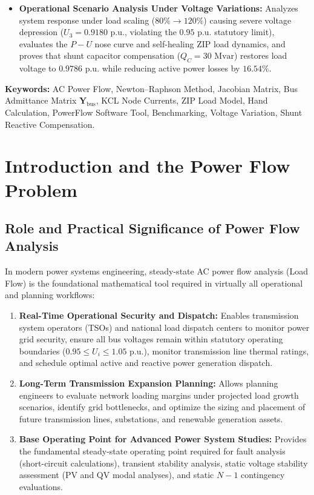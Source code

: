 \documentclass[12pt,a4paper,oneside]{report}
\begin{document}
\begin{itemize}
    \item \textbf{Operational Scenario Analysis Under Voltage Variations:} Analyzes system response under load scaling ($80\% \to 120\%$) causing severe voltage depression ($U_3 = 0.9180\text{ p.u.}$, violating the $0.95\text{ p.u.}$ statutory limit), evaluates the $P-U$ nose curve and self-healing ZIP load dynamics, and proves that shunt capacitor compensation ($Q_C = 30\text{ Mvar}$) restores load voltage to $0.9786\text{ p.u.}$ while reducing active power losses by $16.54\%$.
\end{itemize}

\noindent \textbf{Keywords:} AC Power Flow, Newton--Raphson Method, Jacobian Matrix, Bus Admittance Matrix $\mathbf{Y}_{\text{bus}}$, KCL Node Currents, ZIP Load Model, Hand Calculation, PowerFlow Software Tool, Benchmarking, Voltage Variation, Shunt Reactive Compensation.

\newpage

\tableofcontents
\newpage
\listoffigures
\newpage
\listoftables
\newpage
{}
\setcounter{page}{1}

\chapter{Introduction and the Power Flow Problem}

\section{Role and Practical Significance of Power Flow Analysis}
In modern power systems engineering, steady-state AC power flow analysis (Load Flow) is the foundational mathematical tool required in virtually all operational and planning workflows:
\begin{enumerate}
    \item \textbf{Real-Time Operational Security and Dispatch:} Enables transmission system operators (TSOs) and national load dispatch centers to monitor power grid security, ensure all bus voltages remain within statutory operating boundaries ($0.95 \le U_i \le 1.05\text{ p.u.}$), monitor transmission line thermal ratings, and schedule optimal active and reactive power generation dispatch.
    \item \textbf{Long-Term Transmission Expansion Planning:} Allows planning engineers to evaluate network loading margins under projected load growth scenarios, identify grid bottlenecks, and optimize the sizing and placement of future transmission lines, substations, and renewable generation assets.
    \item \textbf{Base Operating Point for Advanced Power System Studies:} Provides the fundamental steady-state operating point required for fault analysis (short-circuit calculations), transient stability analysis, static voltage stability assessment (PV and QV modal analyses), and static $N-1$ contingency evaluations.
\end{enumerate}
\end{document}
